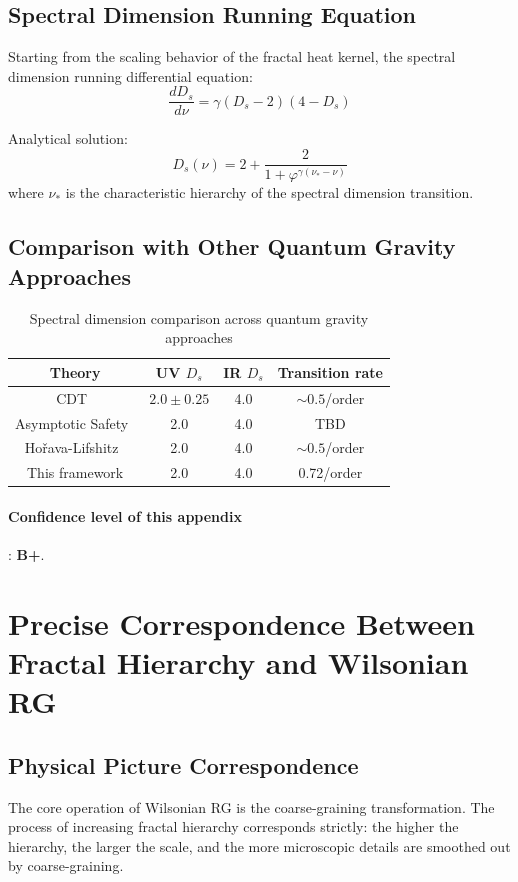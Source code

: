 \documentclass[12pt,a4paper,twocolumn]{article}
\renewcommand{\phi}{\varphi}
\begin{document}
\subsection{Spectral Dimension Running Equation}
Starting from the scaling behavior of the fractal heat kernel, the spectral dimension running differential equation:
\[
\frac{dD_s}{d\nu} = \gamma (D_s-2)(4-D_s)
\]

Analytical solution:
\[
D_s(\nu) = 2 + \frac{2}{1+\phi^{\gamma(\nu_*-\nu)}}
\]
where $\nu_*$ is the characteristic hierarchy of the spectral dimension transition.

\subsection{Comparison with Other Quantum Gravity Approaches}
\begin{table}[H]
\centering
\footnotesize
\caption{Spectral dimension comparison across quantum gravity approaches}
\begin{tabular}{c|c|c|c}
\hline
\textbf{Theory} & \textbf{UV $D_s$} & \textbf{IR $D_s$} & \textbf{Transition rate} \\
\hline
CDT~\cite{Ambjorn2004} & $2.0\pm0.25$ & 4.0 & $\sim0.5$/order \\
Asymptotic Safety~\cite{Reuter1998} & 2.0 & 4.0 & TBD \\
Ho\v{r}ava-Lifshitz~\cite{Horava2009} & 2.0 & 4.0 & $\sim0.5$/order \\
This framework & 2.0 & 4.0 & 0.72/order \\
\hline
\end{tabular}
\end{table}

\paragraph{Confidence level of this appendix}: \textbf{B+}.

\section{Precise Correspondence Between Fractal Hierarchy and Wilsonian RG}
\label{app:rg_mapping}

\subsection{Physical Picture Correspondence}
The core operation of Wilsonian RG is the coarse-graining transformation. The process of increasing fractal hierarchy corresponds strictly: the higher the hierarchy, the larger the scale, and the more microscopic details are smoothed out by coarse-graining.
\end{document}
